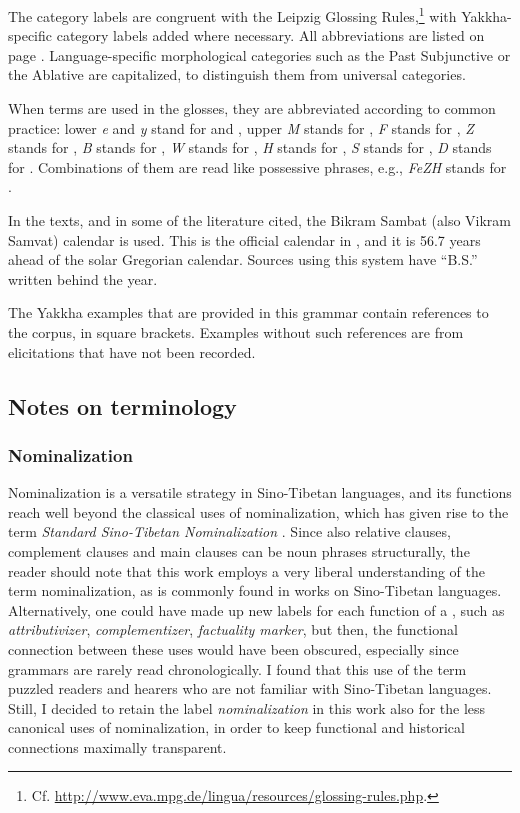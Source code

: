 The category labels are congruent with the Leipzig Glossing Rules,\footnote{Cf. \url{http://www.eva.mpg.de/lingua/resources/glossing-rules.php}.} with Yak\-kha-specific category labels added where necessary. All abbreviations are listed on page \pageref{abbreviations}. Language-specific morphological categories such as the Past Subjunctive  or the Ablative  are capitalized, to distinguish them from universal categories.

When  terms are used in the glosses, they are abbreviated according to common practice: lower   \emph{e} and \emph{y} stand for  and , upper  \emph{M} stands for , \emph{F} stands for , \emph{Z} stands for , \emph{B} stands for , \emph{W} stands for , \emph{H} stands for , \emph{S} stands for , \emph{D} stands for . Combinations of them are read like possessive phrases, e.g., \emph{FeZH} stands for . 


In the texts, and in some of the  literature cited, the Bikram Sambat (also Vikram Samvat) calendar is used. This is the official calendar in , and it is  56.7 years ahead of the solar Gregorian calendar. Sources using this system have ``B.S.'' written behind the year.

The Yakkha examples that are provided in this grammar contain references to the corpus, in square brackets. Examples without such references are from elicitations that have not been recorded.


\subsection{Notes on terminology}\label{terminology}

\subsubsection{Nominalization}

Nominalization is a versatile strategy in Sino-Tibetan languages, and its functions reach well beyond the classical uses of nominalization, which has given rise to the term \emph{Standard Sino-Tibetan Nominalization} \citep{Bickel1999Nominalization}. Since also relative clauses, complement clauses and main clauses can be noun phrases structurally, the reader should note that this work employs a very liberal understanding of the term nominalization, as is commonly found in works on Sino-Tibetan languages. Alternatively, one could have made up new labels for each function of  a , such as \emph{attributivizer}, \emph{complementizer}, \emph{factuality marker}, but then, the functional connection between these uses would have been obscured, especially since grammars are rarely read chronologically. I found that this use of the term puzzled readers and hearers who are not familiar with Sino-Tibetan languages. Still, I decided to retain the label \emph{nominalization} in this work also for the less canonical uses of nominalization, in order to keep functional and historical connections maximally transparent.

